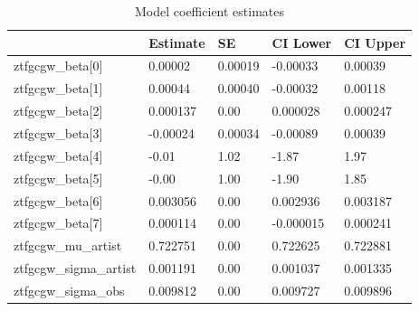 \begin{table}[htbp]
\caption{Model coefficient estimates}
\label{tab:coefficients}
\begin{tabular}{lllll}
\toprule
 & Estimate & SE & CI Lower & CI Upper \\
\midrule
ztfgcgw\_beta[0] & 0.00002 & 0.00019 & -0.00033 & 0.00039 \\
ztfgcgw\_beta[1] & 0.00044 & 0.00040 & -0.00032 & 0.00118 \\
ztfgcgw\_beta[2] & 0.000137 & 0.00 & 0.000028 & 0.000247 \\
ztfgcgw\_beta[3] & -0.00024 & 0.00034 & -0.00089 & 0.00039 \\
ztfgcgw\_beta[4] & -0.01 & 1.02 & -1.87 & 1.97 \\
ztfgcgw\_beta[5] & -0.00 & 1.00 & -1.90 & 1.85 \\
ztfgcgw\_beta[6] & 0.003056 & 0.00 & 0.002936 & 0.003187 \\
ztfgcgw\_beta[7] & 0.000114 & 0.00 & -0.000015 & 0.000241 \\
ztfgcgw\_mu\_artist & 0.722751 & 0.00 & 0.722625 & 0.722881 \\
ztfgcgw\_sigma\_artist & 0.001191 & 0.00 & 0.001037 & 0.001335 \\
ztfgcgw\_sigma\_obs & 0.009812 & 0.00 & 0.009727 & 0.009896 \\
\bottomrule
\end{tabular}
\end{table}
